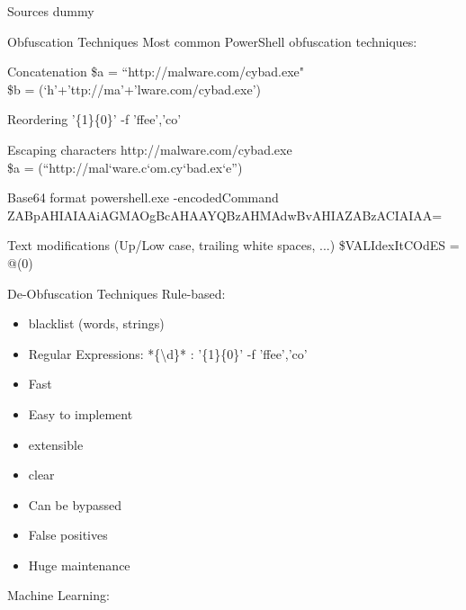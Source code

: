 \begin{frame}{Sources}
dummy
\end{frame}

\begin{frame}{Obfuscation Techniques}
  Most common PowerShell obfuscation techniques:

  \begin{block}{Concatenation}
    \$a = “http://malware.com/cybad.exe"\\
    \$b = (‘h’+’ttp://ma’+’lware.com/cybad.exe’)
  \end{block}

  \begin{block}{Reordering}
    '\{1\}\{0\}' -f 'ffee','co'
  \end{block}

  \begin{block}{Escaping characters}
    http://malware.com/cybad.exe \\
    \$a = (“http://mal`ware.c`om.cy`bad.ex`e”)
  \end{block}

  \begin{block}{Base64 format}
    powershell.exe -encodedCommand ZABpAHIAIAAiAGMAOgBcAHAAYQBzAHMAdwBvAHIAZABzACIAIAA=  
  \end{block}

  \begin{block}{Text modifications (Up/Low case, trailing white spaces, ...)}
    \${VALIdexItCOdES} = @(0)
  \end{block}

\end{frame}


\begin{frame}[fragile]{De-Obfuscation Techniques}
  Rule-based:
  \begin{itemize}
    \item blacklist (words, strings)
    \item Regular Expressions: *\{\textbackslash d\}* : '\{1\}\{0\}' -f 'ffee','co'
    \item Fast
    \item Easy to implement
    \item extensible
    \item clear
    \item Can be bypassed
    \item False positives
    \item Huge maintenance
  \end{itemize}

  Machine Learning:
\end{frame}
